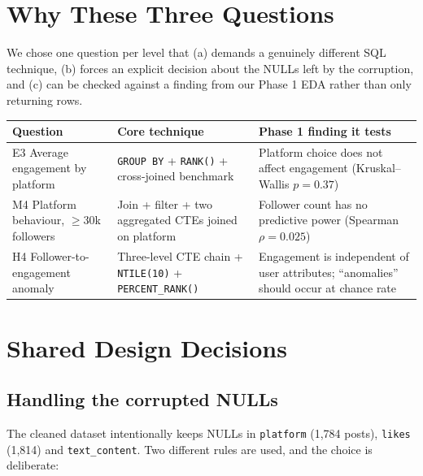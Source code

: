\documentclass[11pt,a4paper]{article}
\begin{document}
\color{bodytext}

\section{Why These Three Questions}

We chose one question per level that (a) demands a genuinely different SQL technique, (b) forces an explicit decision about the NULLs left by the corruption, and (c) can be checked against a finding from our Phase 1 EDA rather than only returning rows.

\begin{table}[H]
\centering\small
\begin{tabular}{@{}llp{7.2cm}@{}}
\toprule
\textbf{Question} & \textbf{Core technique} & \textbf{Phase 1 finding it tests} \\
\midrule
E3 Average engagement by platform & \texttt{GROUP BY} + \texttt{RANK()} + cross-joined benchmark & Platform choice does not affect engagement (Kruskal--Wallis $p=0.37$) \\
M4 Platform behaviour, $\geq$30k followers & Join + filter + two aggregated CTEs joined on platform & Follower count has no predictive power (Spearman $\rho = 0.025$) \\
H4 Follower-to-engagement anomaly & Three-level CTE chain + \texttt{NTILE(10)} + \texttt{PERCENT\_RANK()} & Engagement is independent of user attributes; ``anomalies'' should occur at chance rate \\
\bottomrule
\end{tabular}
\end{table}

\section{Shared Design Decisions}

\subsection{Handling the corrupted NULLs}

The cleaned dataset intentionally keeps NULLs in \texttt{platform} (1,784 posts), \texttt{likes} (1,814) and \texttt{text\_content}. Two different rules are used, and the choice is deliberate:
\end{document}

